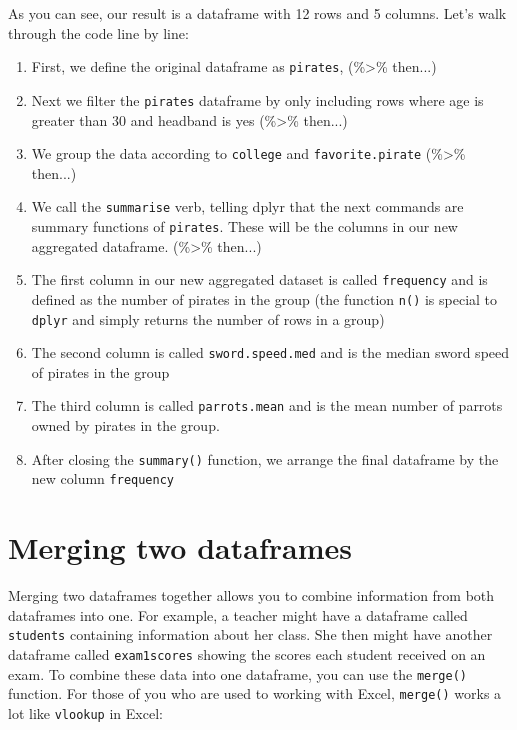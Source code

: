 \documentclass{tufte-book}\usepackage[]{graphicx}\usepackage[]{color}
\begin{document}
\begin{footnotesize}
As you can see, our result is a dataframe with 12 rows and 5 columns. Let's walk through the code line by line:

\begin{enumerate}

  \item First, we define the original dataframe as \texttt{pirates}, (\%>\% then...)
  \item Next we filter the \texttt{pirates} dataframe by only including rows where age is greater than 30 and headband is yes (\%>\% then...)
  \item We group the data according to \texttt{college} and \texttt{favorite.pirate} (\%>\% then...)
  \item We call the \texttt{summarise} verb, telling dplyr that the next commands are summary functions of \texttt{pirates}. These will be the columns in our new aggregated dataframe. (\%>\% then...)
  \item The first column in our new aggregated dataset is called \texttt{frequency} and is defined as the number of pirates in the group (the function \texttt{n()} is special to \texttt{dplyr} and simply returns the number of rows in a group)
  \item The second column is called \texttt{sword.speed.med} and is the median sword speed of pirates in the group
  \item The third column is called \texttt{parrots.mean} and is the mean number of parrots owned by pirates in the group.
  \item After closing the \texttt{summary()} function, we arrange the final dataframe by the new column \texttt{frequency}
  
\end{enumerate}


\section{Merging two dataframes}

Merging two dataframes together allows you to combine information from both dataframes into one. For example, a teacher might have a dataframe called \texttt{students} containing information about her class. She then might have another dataframe called \texttt{exam1scores} showing the scores each student received on an exam. To combine these data into one dataframe, you can use the \texttt{merge()} function. For those of you who are used to working with Excel, \texttt{merge()} works a lot like \texttt{vlookup} in Excel:



\end{footnotesize}
\end{document}
